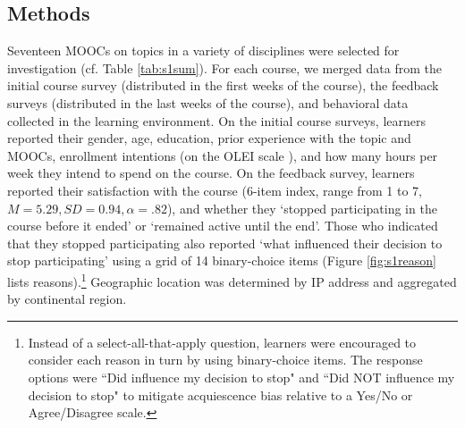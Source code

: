 \documentclass{sigchi}\usepackage[]{graphicx}\usepackage[]{color}
\begin{document}
\subsection{Methods}

Seventeen MOOCs on topics in a variety of disciplines were selected for investigation (cf. Table \ref{tab:s1sum}). For each course, we merged data from the initial course survey (distributed in the first weeks of the course), the feedback surveys (distributed in the last weeks of the course), and behavioral data collected in the learning environment. 
On the initial course surveys, learners reported their gender, age, education, prior experience with the topic and MOOCs, enrollment intentions (on the OLEI scale \cite{kizilcec2015motivation}), and how many hours per week they intend to spend on the course. On the feedback survey, learners reported their satisfaction with the course (6-item index, range from 1 to 7, $M=5.29, SD=0.94, \alpha=.82$), and whether they `stopped participating in the course before it ended' or `remained active until the end'. Those who indicated that they stopped participating also reported `what influenced their decision to stop participating' using a grid of 14 binary-choice items (Figure \ref{fig:s1reason} lists reasons).\footnote{Instead of a select-all-that-apply question, learners were encouraged to consider each reason in turn by using binary-choice items. The response options were ``Did influence my decision to stop" and ``Did NOT influence my decision to stop" to mitigate acquiescence bias relative to a Yes/No or Agree/Disagree scale.} Geographic location was determined by IP address and aggregated by continental region.
\end{document}

